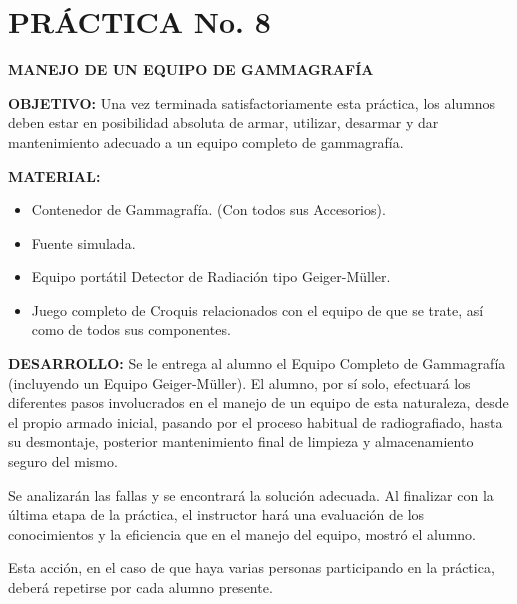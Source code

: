 
\section*{PRÁCTICA No. 8}

\textbf{MANEJO DE UN EQUIPO DE GAMMAGRAFÍA}

\textbf{OBJETIVO:} Una vez terminada satisfactoriamente esta práctica, los alumnos deben estar en posibilidad absoluta de armar, utilizar, desarmar y dar mantenimiento adecuado a un equipo completo de gammagrafía.

\textbf{MATERIAL:}
\begin{itemize}
    \item[1] Contenedor de Gammagrafía. (Con todos sus Accesorios).
    \item[1] Fuente simulada.
    \item[1] Equipo portátil Detector de Radiación tipo Geiger-Müller.
    \item[1] Juego completo de Croquis relacionados con el equipo de que se trate, así como de todos sus componentes.
\end{itemize}

\textbf{DESARROLLO:} Se le entrega al alumno el Equipo Completo de Gammagrafía (incluyendo un Equipo Geiger-Müller). El alumno, por sí solo, efectuará los diferentes pasos involucrados en el manejo de un equipo de esta naturaleza, desde el propio armado inicial, pasando por el proceso habitual de radiografiado, hasta su desmontaje, posterior mantenimiento final de limpieza y almacenamiento seguro del mismo.

Se analizarán las fallas y se encontrará la solución adecuada. Al finalizar con la última etapa de la práctica, el instructor hará una evaluación de los conocimientos y la eficiencia que en el manejo del equipo, mostró el alumno.

Esta acción, en el caso de que haya varias personas participando en la práctica, deberá repetirse por cada alumno presente.


